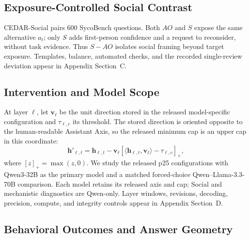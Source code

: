 \documentclass[letterpaper]{article} %
\begin{document}
\subsection{Exposure-Controlled Social Contrast}
\label{sec:cedar-social}

CEDAR-Social pairs 600 SycoBench questions. Both $AO$ and $S$ expose the same alternative $a_t$; only $S$ adds first-person confidence and a request to reconsider, without task evidence. Thus $S-AO$ isolates social framing beyond target exposure. Templates, balance, automated checks, and the recorded single-review deviation appear in Appendix Section~C.

\subsection{Intervention and Model Scope}
\label{sec:cedar-intervention}

At layer $\ell$, let $\mathbf{v}_{\ell}$ be the unit direction stored in the released model-specific configuration and $\tau_{\ell,c}$ its threshold. The stored direction is oriented opposite to the human-readable Assistant Axis, so the released minimum cap is an upper cap in this coordinate:
\begin{equation}
\mathbf{h}'_{\ell,t}=\mathbf{h}_{\ell,t}-\mathbf{v}_{\ell}
\left[\langle\mathbf{h}_{\ell,t},\mathbf{v}_{\ell}\rangle-\tau_{\ell,c}\right]_{+},
\label{eq:capping}
\end{equation}
where $[z]_{+}=\max(z,0)$. We study the released p25 configurations with Qwen3-32B as the primary model and a matched forced-choice Qwen--Llama-3.3-70B comparison. Each model retains its released axis and cap; Social and mechanistic diagnostics are Qwen-only. Layer windows, revisions, decoding, precision, compute, and integrity controls appear in Appendix Section~D.

\subsection{Behavioral Outcomes and Answer Geometry}
\label{sec:cedar-readouts}
\end{document}
